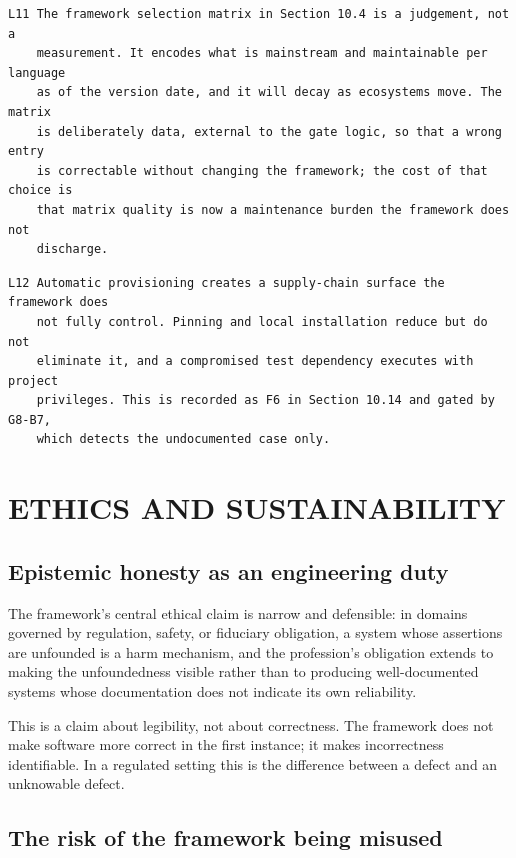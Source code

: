 \documentclass[11pt,a4paper]{article}
\begin{document}
\begin{Verbatim}[fontsize=\footnotesize,breaklines=true,breakanywhere=true,breakautoindent=false,samepage=false]
L11 The framework selection matrix in Section 10.4 is a judgement, not a
    measurement. It encodes what is mainstream and maintainable per language
    as of the version date, and it will decay as ecosystems move. The matrix
    is deliberately data, external to the gate logic, so that a wrong entry
    is correctable without changing the framework; the cost of that choice is
    that matrix quality is now a maintenance burden the framework does not
    discharge.
\end{Verbatim}

\begin{Verbatim}[fontsize=\footnotesize,breaklines=true,breakanywhere=true,breakautoindent=false,samepage=false]
L12 Automatic provisioning creates a supply-chain surface the framework does
    not fully control. Pinning and local installation reduce but do not
    eliminate it, and a compromised test dependency executes with project
    privileges. This is recorded as F6 in Section 10.14 and gated by G8-B7,
    which detects the undocumented case only.
\end{Verbatim}

\section{ETHICS AND SUSTAINABILITY}

\subsection{Epistemic honesty as an engineering duty}

The framework's central ethical claim is narrow and defensible: in domains governed by regulation, safety, or fiduciary obligation, a system whose assertions are unfounded is a harm mechanism, and the profession's obligation extends to making the unfoundedness visible rather than to producing well-documented systems whose documentation does not indicate its own reliability.

This is a claim about legibility, not about correctness. The framework does not make software more correct in the first instance; it makes incorrectness identifiable. In a regulated setting this is the difference between a defect and an unknowable defect.

\subsection{The risk of the framework being misused}
\end{document}
